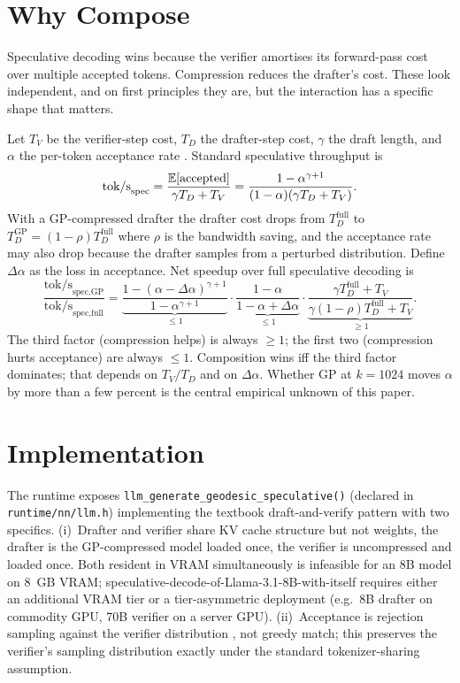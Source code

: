 \documentclass[11pt]{article}
\begin{document}
\clearpage
\tableofcontents
\clearpage

\section{Why Compose}
\label{sec:why}
Speculative decoding wins because the verifier amortises its forward-pass
cost over multiple accepted tokens.  Compression reduces the drafter's
cost.  These look independent, and on first principles they are, but the
interaction has a specific shape that matters.

Let $T_V$ be the verifier-step cost, $T_D$ the drafter-step cost, $\gamma$
the draft length, and $\alpha$ the per-token acceptance rate
\cite{leviathan2023speculative}.  Standard speculative throughput is
\begin{equation}
\label{eq:spec}
\text{tok/s}_\text{spec}
= \frac{\mathbb{E}[\text{accepted}]}{\gamma T_D + T_V}
= \frac{1-\alpha^{\gamma+1}}{(1-\alpha)(\gamma T_D+T_V)}.
\end{equation}
With a GP-compressed drafter the drafter cost drops from
$T_D^\text{full}$ to $T_D^\text{GP}=(1-\rho)T_D^\text{full}$ where
$\rho$ is the bandwidth saving, and the acceptance rate may also drop
because the drafter samples from a perturbed distribution.  Define
$\Delta\alpha$ as the loss in acceptance.  Net speedup over full
speculative decoding is
\begin{equation}
\label{eq:netspeedup}
\frac{\text{tok/s}_\text{spec,GP}}{\text{tok/s}_\text{spec,full}}
=
\underbrace{\frac{1-(\alpha-\Delta\alpha)^{\gamma+1}}{1-\alpha^{\gamma+1}}}_{\leq 1}
\cdot
\underbrace{\frac{1-\alpha}{1-\alpha+\Delta\alpha}}_{\leq 1}
\cdot
\underbrace{\frac{\gamma T_D^\text{full}+T_V}{\gamma(1-\rho)T_D^\text{full}+T_V}}_{\geq 1}.
\end{equation}
The third factor (compression helps) is always $\geq 1$; the first two
(compression hurts acceptance) are always $\leq 1$.  Composition wins iff
the third factor dominates; that depends on $T_V/T_D$ and on $\Delta\alpha$.
Whether GP at $k{=}1024$ moves $\alpha$ by more than a few percent is the
central empirical unknown of this paper.

\section{Implementation}
The runtime exposes
\texttt{llm\_generate\_geodesic\_speculative()} (declared in
\texttt{runtime/nn/llm.h}) implementing the textbook draft-and-verify
pattern with two specifics.  (i)~Drafter and verifier share KV
cache structure but not weights, the drafter is the GP-compressed
model loaded once, the verifier is uncompressed and loaded once.  Both
resident in VRAM simultaneously is infeasible for an 8B model on 8~GB
VRAM; speculative-decode-of-Llama-3.1-8B-with-itself requires either an
additional VRAM tier or a tier-asymmetric deployment (e.g.\ 8B drafter
on commodity GPU, 70B verifier on a server GPU).  (ii)~Acceptance
is rejection sampling against the verifier distribution
\cite{leviathan2023speculative,chen2023speculative}, not greedy match;
this preserves the verifier's sampling distribution exactly under the
standard tokenizer-sharing assumption.
\end{document}
